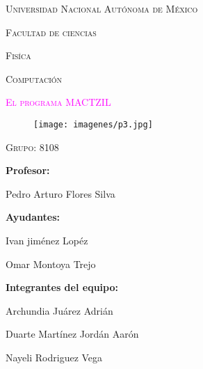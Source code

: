 \documentclass[12pt,letterpaper]{article}
\begin{document}
\begin{center}
    \textsc{\Huge{Universidad Nacional Autónoma de México}}
    \\
\end{center}
\begin{center}
{\textsc{\Huge{Facultad de ciencias}}}
\end{center}
\begin{center}
{\textsc{\Huge{Fisíca}}}
\end{center}
\begin{center}
{\textsc{\Huge{Computación}}}
\end{center}

\begin{center}
\vspace{0.5cm}
    \textcolor{magenta}{\textsc{\Huge{El programa MACTZIL}}}
\end{center}

\begin{SCfigure}[0.999][ht]
\raggedright
     \texttt{[image: imagenes/p3.jpg]}
     \label{fig:my_label} 
\end{SCfigure}
\vspace{0.3cm}
\begin{center}
   \textsc{\Huge{Grupo: 8108 }}
\end{center}
\begin{multicols}{2}
\Large{\textbf{Profesor:}}
	
 Pedro Arturo Flores Silva

\Large{\textbf{Ayudantes:}}

Ivan jiménez Lopéz 

Omar Montoya Trejo	

\Large{\textbf{Integrantes del equipo:}}

Archundia Juárez Adrián

Duarte Martínez Jordán Aarón

Nayeli Rodriguez Vega

\end{multicols}


\newpage
\end{document}
